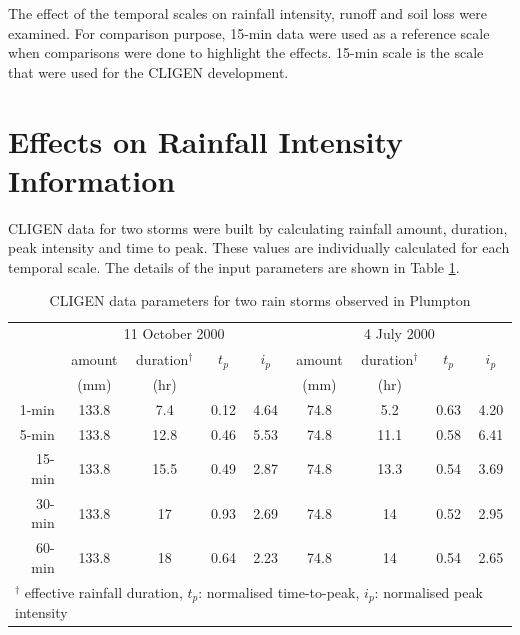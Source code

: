 The effect of the temporal scales on rainfall intensity, runoff and soil loss
were examined. For comparison purpose, 15-min data were used as a reference
scale when comparisons were done to highlight the effects. 15-min scale is
the scale that were used for the CLIGEN development.


\section{Effects on Rainfall Intensity Information}
\label{sec:EffectsOnRainfallIntensityInput}

CLIGEN data for two storms were built by calculating rainfall amount, duration,
peak intensity and time to peak. These values are individually calculated for
each temporal scale. The details of the input parameters are shown in Table
\ref{tab:CLIGENWEPPInputFileParameters}.

\begin{table}[htbp]
  \centering
  \small
  \caption{CLIGEN data parameters for two rain storms observed in
Plumpton}
  \label{tab:CLIGENWEPPInputFileParameters}
    \begin{tabular}{rcccccccc} \toprule
       & \multicolumn{4}{c}{11 October 2000} &
\multicolumn{4}{c}{4 July 2000}\\
       \cmidrule(r){2-5} \cmidrule(l){6-9}
       & amount & duration$^{\dagger}$ & $t_p$ & $i_p$ & amount &
duration$^{\dagger}$ & $t_p$ & $i_p$\\
       & \scriptsize(mm) & \scriptsize(hr) & & & \scriptsize(mm) &
\scriptsize(hr) & & \\
       \midrule
      1-min  & 133.8 & 7.4  & 0.12 & 4.64 & 74.8 & 5.2  & 0.63 & 4.20\\
      5-min  & 133.8 & 12.8 & 0.46 & 5.53 & 74.8 & 11.1 & 0.58 & 6.41\\
      15-min & 133.8 & 15.5 & 0.49 & 2.87 & 74.8 & 13.3 & 0.54 & 3.69\\
      30-min & 133.8 & 17   & 0.93 & 2.69 & 74.8 & 14   & 0.52 & 2.95\\
      60-min & 133.8 & 18   & 0.64 & 2.23 & 74.8 & 14   & 0.54 & 2.65\\
      \bottomrule
      \multicolumn{9}{l}{\footnotesize $^\dagger$ effective rainfall
duration, {\normalsize{$t_p$}}: normalised time-to-peak, {\normalsize{$i_p$}}:
normalised peak intensity}
    \end{tabular}
\end{table}


